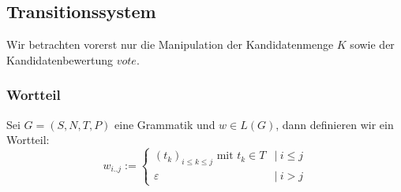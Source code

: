 \documentclass[]{article}
\begin{document}





\subsection{Transitionssystem}

Wir betrachten vorerst nur die Manipulation der Kandidatenmenge $K$ sowie der Kandidatenbewertung $vote$. 


% 


% 

\subsubsection*{Wortteil}

Sei $G=(S,N,T,P)$ eine Grammatik und $w\in L(G)$, dann definieren wir ein Wortteil: 
\[ 
w_{i..j} := 
\begin{cases}
  (t_k)_{i\leq k \leq j}\text{ mit }t_k\in T &|\ i\leq j \\
  \varepsilon &|\ i>j
\end{cases}
\] 
\end{document}
